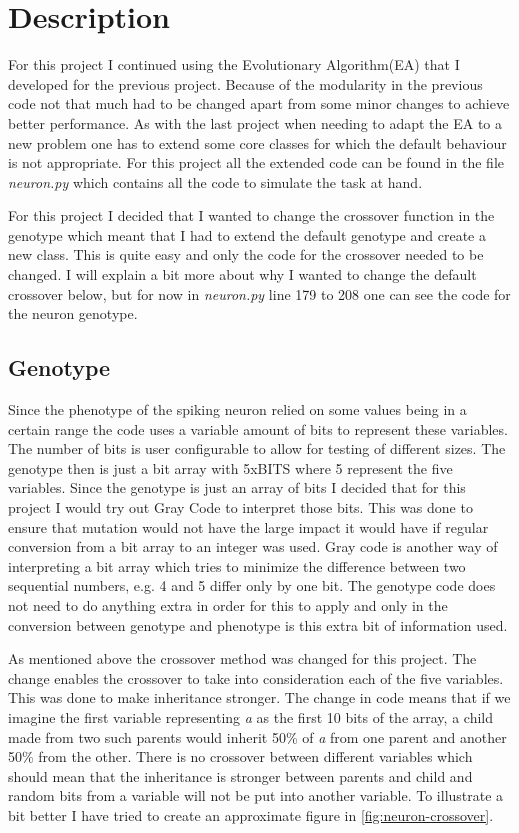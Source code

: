 \section{Description}\label{sec:description}
For this project I continued using the Evolutionary Algorithm(EA) that I
developed for the previous project. Because of the modularity in the previous
code not that much had to be changed apart from some minor changes to achieve
better performance. As with the last project when needing to adapt the EA to a
new problem one has to extend some core classes for which the default behaviour
is not appropriate. For this project all the extended code can be found in the
file \textit{neuron.py} which contains all the code to simulate the task at
hand.

For this project I decided that I wanted to change the crossover function in the
genotype which meant that I had to extend the default genotype and create a new
class. This is quite easy and only the code for the crossover needed to be
changed. I will explain a bit more about why I wanted to change the default
crossover below, but for now in \textit{neuron.py} line 179 to 208 one can see
the code for the neuron genotype.

\subsection{Genotype}\label{sec:genotype-description}
Since the phenotype of the spiking neuron relied on some values being in a
certain range the code uses a variable amount of bits to represent these
variables. The number of bits is user configurable to allow for testing of
different sizes. The genotype then is just a bit array with 5xBITS where 5 represent
the five variables. Since the genotype is just an array of bits I decided that
for this project I would try out Gray Code to interpret those bits. This was
done to ensure that mutation would not have the large impact it would have if
regular conversion from a bit array to an integer was used. Gray code is another
way of interpreting a bit array which tries to minimize the difference between
two sequential numbers, e.g. 4 and 5 differ only by one bit. The genotype code
does not need to do anything extra in order for this to apply and only in the
conversion between genotype and phenotype is this extra bit of information used.

As mentioned above the crossover method was changed for this project. The change
enables the crossover to take into consideration each of the five variables.
This was done to make inheritance stronger. The change in code means that if we
imagine the first variable
representing \textit{a} as the first 10 bits of the array, a child made from two
such parents would inherit 50\% of \textit{a} from one parent and another 50\%
from the other. There is no crossover between different variables which should
mean that the inheritance is stronger between parents and child and random bits
from a variable will not be put into another variable. To illustrate a bit
better I have tried to create an approximate figure in
\ref{fig:neuron-crossover}.

